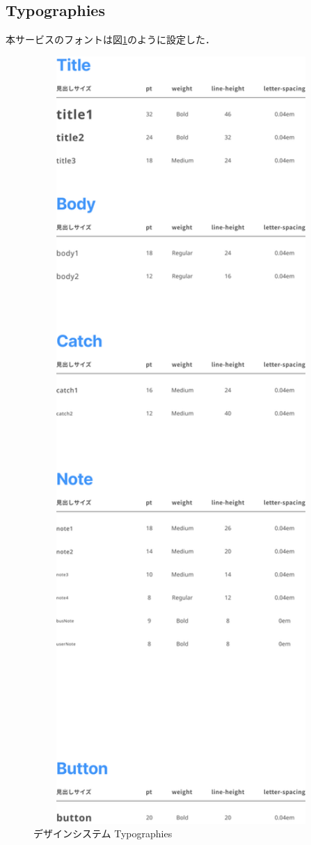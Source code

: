 \subsection{Typographies}
本サービスのフォントは図\ref{fig:typographies}のように設定した．
\begin{figure}[H]
    \centering
    \includegraphics[width=14cm]{images/typographies.png}
    \caption{デザインシステム Typographies}
    \label{fig:typographies}
\end{figure}
